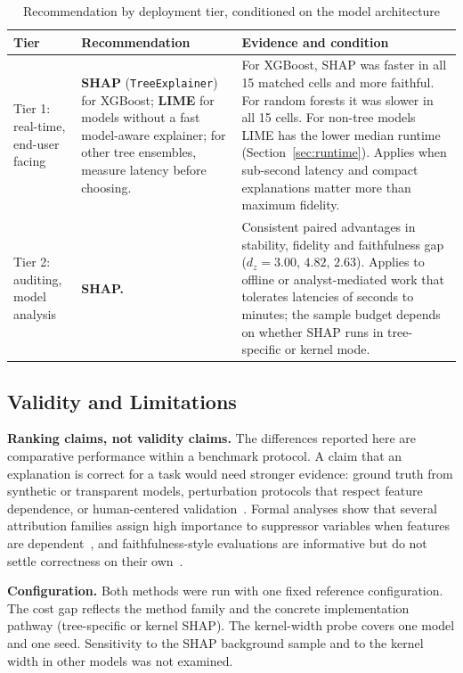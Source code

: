 \documentclass{cleiej}
\begin{document}
\begin{table}[htb]
\centering
\caption{Recommendation by deployment tier, conditioned on the model
architecture}
\label{tab:hybrid_deployment}
\begin{tabularx}{\linewidth}{p{2.4cm} >{\raggedright\arraybackslash}p{4.2cm} X}
\toprule
\textbf{Tier} & \textbf{Recommendation} & \textbf{Evidence and condition} \\
\midrule
Tier 1: real-time, end-user facing &
\textbf{SHAP} (\texttt{TreeExplainer}) for XGBoost; \textbf{LIME} for
models without a fast model-aware explainer; for other tree ensembles,
measure latency before choosing. &
For XGBoost, SHAP was faster in all 15 matched cells and more faithful.
For random forests it was slower in all 15 cells. For non-tree models LIME
has the lower median runtime (Section~\ref{sec:runtime}). Applies when
sub-second latency and compact explanations matter more than maximum
fidelity. \\[4pt]
Tier 2: auditing, model analysis &
\textbf{SHAP.} &
Consistent paired advantages in stability, fidelity and faithfulness gap
($d_z = 3.00$, $4.82$, $2.63$). Applies to offline or analyst-mediated work
that tolerates latencies of seconds to minutes; the sample budget depends
on whether SHAP runs in tree-specific or kernel mode. \\
\bottomrule
\end{tabularx}
\end{table}

\subsection{Validity and Limitations}
\label{sec:validity}

\textbf{Ranking claims, not validity claims.} The differences reported here
are comparative performance within a benchmark protocol. A claim that an
explanation is correct for a task would need stronger evidence: ground
truth from synthetic or transparent models, perturbation protocols that
respect feature dependence, or human-centered
validation~\cite{haufe2026formalization,doshivelez2017rigorous}. Formal
analyses show that several attribution families assign high importance to
suppressor variables when features are
dependent~\cite{wilming2022scrutinizing,wilming2023theoretical}, and
faithfulness-style evaluations are informative but do not settle
correctness on their own~\cite{jacovi2020faithfulness,rong2022consistent}.

\textbf{Configuration.} Both methods were run with one fixed reference
configuration. The cost gap reflects the method family and the concrete
implementation pathway (tree-specific or kernel SHAP). The kernel-width
probe covers one model and one seed. Sensitivity to the SHAP background
sample and to the kernel width in other models was not examined.
\end{document}
